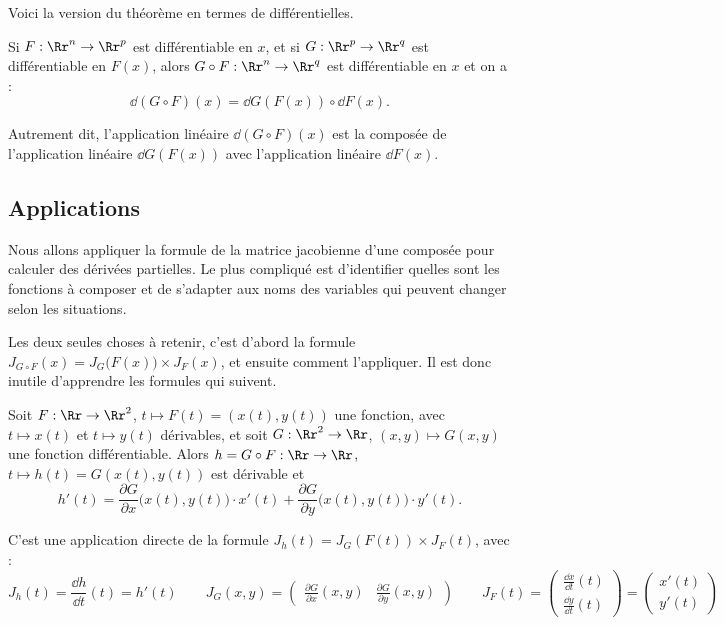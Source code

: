 \documentclass[11pt, class=report,crop=false]{standalone}
\begin{document}
\bigskip

Voici la version du théorème en termes de différentielles.
\begin{theoreme}
Si $F : \Rr^n \to \Rr^p$ est différentiable en $x$, et si $G: \Rr^p \to \Rr^q$ est différentiable en $F(x)$, alors $G \circ F : \Rr^n \to \Rr^q$ est différentiable en $x$ et on a : 
$$
\dd (G \circ F) (x) = \dd {G} (F(x)) \circ \dd F (x).
$$
\end{theoreme}

Autrement dit, l'application linéaire $\dd (G \circ F) (x)$ est la composée de l'application linéaire $\dd {G} (F(x))$ avec l'application linéaire $\dd F (x)$.

\subsection{Applications}


Nous allons appliquer la formule de la matrice jacobienne d'une composée pour calculer des dérivées partielles. Le plus compliqué est d'identifier quelles sont les fonctions à composer et de s'adapter aux noms des variables qui peuvent changer selon les situations.

Les deux seules choses à retenir, c'est d'abord la formule
$J_{G \circ F} (x) = J_G \big( F(x) \big) \times J_F (x)$,
et ensuite comment l'appliquer. Il est donc inutile d'apprendre les formules qui suivent.

\bigskip



\begin{proposition}
Soit $F : \Rr \to \Rr^2$, $t \mapsto F(t)=(x(t),y(t))$ une fonction, avec $t\mapsto x(t)$ et $t \mapsto y(t)$ dérivables, et soit $G : \Rr^2 \to \Rr$, $(x,y) \mapsto G(x,y)$  une fonction différentiable.
Alors $h = G \circ F : \Rr \to \Rr$, $t \mapsto h(t)= G( x(t), y(t))$ est dérivable et
$$h'(t) =  
\frac{\partial G}{\partial x}\big( x(t), y(t) \big) \cdot x'(t) +
\frac{\partial G}{\partial y}\big( x(t), y(t) \big) \cdot y'(t).
$$
\end{proposition}

C'est une application directe de la formule
$J_h (t) = J_G ( F(t) ) \times J_F (t)$, avec :
$$J_h(t) = \frac{\dd h}{\dd t}(t) = h'(t) \qquad
J_G(x,y) = \begin{pmatrix} \frac{\partial G}{\partial x}(x,y)
&  \frac{\partial G}{\partial y}(x,y) \end{pmatrix} \qquad
J_F (t) = \begin{pmatrix} \frac{\dd x}{\dd t}(t) \\  \frac{\dd y}{\dd t}(t) \end{pmatrix}
= \begin{pmatrix} x'(t) \\ y'(t) \end{pmatrix}$$ 
\end{document}

